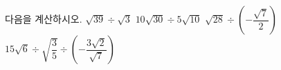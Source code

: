 다음을 계산하시오.
 $\sqrt{39}\div\sqrt{3}$
 $10\sqrt{30}\div 5\sqrt{10}$
 $\sqrt{28}\div\left(-\dfrac{\sqrt{7}}{2}\right)$
 $15\sqrt{6}\div\sqrt{\dfrac{3}{5}}\div\left(-\dfrac{3\sqrt{2}}{\sqrt{7}}\right)$
